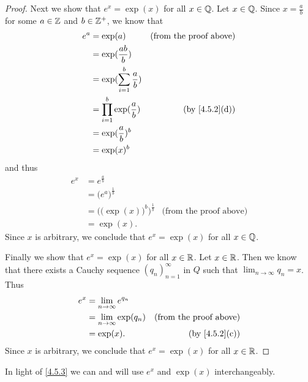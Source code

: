 \begin{proof}
  Next we show that \(e^x = \exp(x)\) for all \(x \in \mathbb{Q}\).
  Let \(x \in \mathbb{Q}\).
  Since \(x = \frac{a}{b}\) for some \(a \in \mathbb{Z}\) and \(b \in \mathbb{Z}^+\), we know that
  \begin{align*}
    e^a & = \exp(a)                           & \text{(from the proof above)} \\
        & = \exp(\frac{ab}{b})                                                \\
        & = \exp(\sum_{i = 1}^b \frac{a}{b})                                  \\
        & = \prod_{i = 1}^b \exp(\frac{a}{b}) & \text{(by \cref{4.5.2}(d))}   \\
        & = \exp(\frac{a}{b})^b                                               \\
        & = \exp(x)^b
  \end{align*}
  and thus
  \begin{align*}
    e^x & = e^{\frac{a}{b}}                                                             \\
        & = \big(e^a\big)^{\frac{1}{b}}                                                 \\
        & = \Big(\big(\exp(x)\big)^b\Big)^{\frac{1}{b}} & \text{(from the proof above)} \\
        & = \exp(x).
  \end{align*}
  Since \(x\) is arbitrary, we conclude that \(e^x = \exp(x)\) for all \(x \in \mathbb{Q}\).

  Finally we show that \(e^x = \exp(x)\) for all \(x \in \mathbb{R}\).
  Let \(x \in \mathbb{R}\).
  Then we know that there exists a Cauchy sequence \((q_n)_{n = 1}^\infty\) in \(Q\) such that \(\lim_{n \to \infty} q_n = x\).
  Thus
  \begin{align*}
    e^x & = \lim_{n \to \infty} e^{q_n}                                   \\
        & = \lim_{n \to \infty} \exp(q_n) & \text{(from the proof above)} \\
        & = \exp(x).                      & \text{(by \cref{4.5.2}(c))}
  \end{align*}
  Since \(x\) is arbitrary, we conclude that \(e^x = \exp(x)\) for all \(x \in \mathbb{R}\).
\end{proof}

\begin{note}
  In light of \cref{4.5.3} we can and will use \(e^x\) and \(\exp(x)\) interchangeably.
\end{note}

